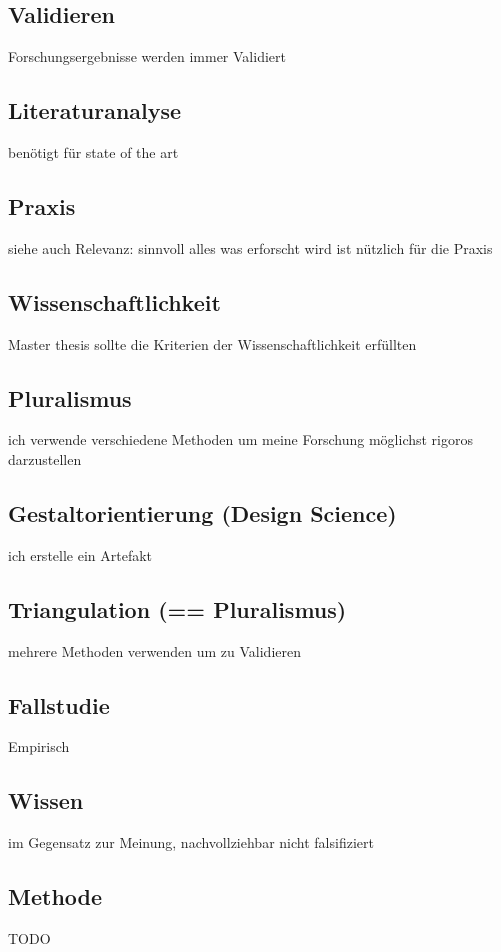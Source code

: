 \documentclass[DIV=calc, paper=a4, fontsize=11pt, twocolumn]{scrartcl}	 %
\begin{document}
\subsection*{Validieren}
Forschungsergebnisse werden immer Validiert

\subsection*{Literaturanalyse}
benötigt für state of the art

\subsection*{Praxis}
siehe auch Relevanz: sinnvoll alles was erforscht wird ist nützlich für die Praxis

\subsection*{Wissenschaftlichkeit}
Master thesis sollte die Kriterien der Wissenschaftlichkeit erfüllten

\subsection*{Pluralismus}
ich verwende verschiedene Methoden um meine Forschung möglichst rigoros darzustellen

\subsection*{Gestaltorientierung (Design Science)}
ich erstelle ein Artefakt

\subsection*{Triangulation (== Pluralismus)}
mehrere Methoden verwenden um zu Validieren

\subsection*{Fallstudie}
Empirisch

\subsection*{Wissen}
im Gegensatz zur Meinung, nachvollziehbar nicht falsifiziert

\subsection*{Methode}
TODO
\end{document}

